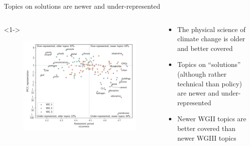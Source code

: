 \documentclass[9pt, aspectratio=169]{beamer}
\begin{document}
\begin{frame}{Topics on solutions are newer and under-represented}

\vspace{-0.5cm}

\begin{columns}
	
	\begin{column}{0.618\linewidth}<1->
		\begin{figure}[h!]
			\begin{center}
				\includegraphics[width=\linewidth]{../plots_pub/rep_time_lp.pdf}
			\end{center}
		\end{figure}
		
	\end{column}
	\begin{column}{0.382\linewidth}
		\begin{itemize}
			\item<1-> The physical science of climate change is older and better covered
			\item<1-> Topics on ``solutions'' (although rather technical than policy) are newer and under-represented
			\item<1-> Newer WGII topics are better covered than newer WGIII topics
			
			
		\end{itemize}
	\end{column}
\end{columns}
\end{frame}
\end{document}
